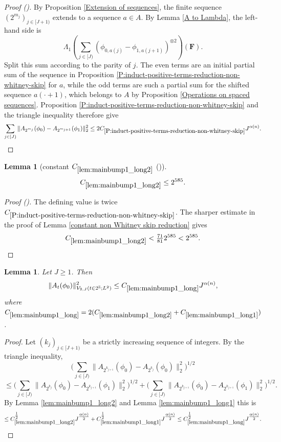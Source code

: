 \documentclass[12pt,reqno]{amsart}
\newcommand{\auto}{{({\tiny\faCar})}}
\theoremstyle{plain}
\newtheorem{lemma}[theorem]{Lemma}
\numberwithin{equation}{section}
\theoremstyle{remark}
\newcommand{\using}[1]{}
\newcommand{\F}{\mathbf{F}}
\begin{document}
\begin{proof}[Proof \auto]
By Proposition \ref{Extension of sequences}, the finite sequence $(2^{m_j})_{j\in[J+1)}$ extends to a sequence $a\in A$. By Lemma \ref{A to Lambda}, the left-hand side is
\[
\Lambda_1\left(\sum_{j\in[J)}
(\phi_{0,a(j)}-\phi_{1,a(j+1)})^{\otimes2}\right)(\F).
\]
Split this sum according to the parity of $j$. The even terms are an initial partial sum of the sequence in Proposition \ref{P:induct-positive-terms-reduction-non-whitney-skip} for $a$, while the odd terms are such a partial sum for the shifted sequence $a(\cdot+1)$, which belongs to $A$ by Proposition \ref{Operations on spaced sequences}. Proposition \ref{P:induct-positive-terms-reduction-non-whitney-skip} and the triangle inequality therefore give
\[
\sum_{j\in[J)}
\|A_{2^{m_j}}(\phi_0)-A_{2^{m_{j+1}}}(\phi_1)\|_2^2
\le2C_{\ref{P:induct-positive-terms-reduction-non-whitney-skip}}J^{\alpha(n)}.
\]
\end{proof}

\begin{lemma}[constant $C_{\ref{lem:mainbump1_long2}}$ \auto]\label{constant main bump one long two}\using{P:induct-positive-terms-reduction-non-whitney-skip}\using{constant non Whitney skip reduction}\using{lem:mainbump1_long2}
\begin{equation}\label{constant main bump one long two bound}
C_{\ref{lem:mainbump1_long2}}\le2^{585}.
\end{equation}
\end{lemma}
\begin{proof}[Proof \auto]
The defining value is twice $C_{\ref{P:induct-positive-terms-reduction-non-whitney-skip}}$. The sharper estimate in the proof of Lemma \ref{constant non Whitney skip reduction} gives
\[
C_{\ref{lem:mainbump1_long2}}<\tfrac{71}{81}2^{585}<2^{585}.
\]
\end{proof}


\begin{lemma}\label{lem:mainbump1_long}\using{lem:mainbump1_long2}\using{lem:mainbump1_long1}
Let $J\ge 1$. Then
\begin{equation}\label{mainbump1_long}
\|A_{t}(\phi_0)\|^2_{V_{2,J}(t\in 2^\mathbb{Z}; L^2)}  \le C_{\ref{lem:mainbump1_long}} J^{\alpha(n)},
\end{equation}
where $C_{\ref{lem:mainbump1_long}}=2(C_{\ref{lem:mainbump1_long2}} + C_{\ref{lem:mainbump1_long1}})$.
\end{lemma}

\begin{proof}
Let $(k_j)_{j\in [J+1)}$ be a strictly increasing sequence of integers.
By the triangle inequality,
\[ \Big(\sum_{j\in [J)} \|A_{2^{k_{j+1}}}(\phi_0)- A_{2^{k_j}}(\phi_0)\|_2^2\Big)^{1/2} \]
\[ \le \Big(\sum_{j\in [J)} \|A_{2^{k_{j}}}(\phi_0)- A_{2^{k_{j+1}}}(\phi_1)\|_2^2\Big)^{1/2}
+ \Big(\sum_{j\in [J)} \|A_{2^{k_{j+1}}}(\phi_0)- A_{2^{k_{j+1}}}(\phi_1)\|_2^2\Big)^{1/2}.
\]
By Lemma \ref{lem:mainbump1_long2} and Lemma \ref{lem:mainbump1_long1} this is
\[ \le C_{\ref{lem:mainbump1_long2}}^{\tfrac12} J^{\tfrac{\alpha(n)}{2}} + C_{\ref{lem:mainbump1_long1}}^{\tfrac12} J^{\tfrac{\alpha(n)}{2}} \le C_{\ref{lem:mainbump1_long}}^{\tfrac12} J^{\tfrac{\alpha(n)}{2}}.  \]
\end{proof}
\end{document}
